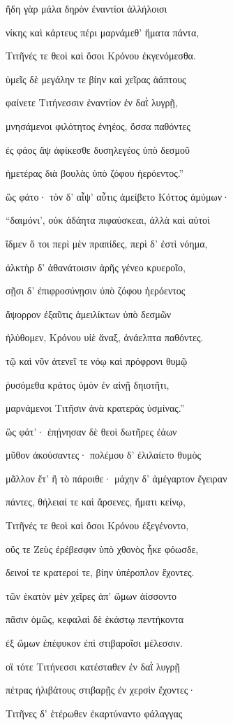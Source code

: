 \begin{pages}
\begin{Leftside}
ἤδη γὰρ μάλα δηρὸν ἐναντίοι ἀλλήλοισι

νίκης καὶ κάρτευς πέρι μαρνάμεθ' ἤματα πάντα, 

Τιτῆνές τε θεοὶ καὶ ὅσοι Κρόνου ἐκγενόμεσθα.

ὑμεῖς δὲ μεγάλην τε βίην καὶ χεῖρας ἀάπτους

φαίνετε Τιτήνεσσιν ἐναντίον ἐν δαῒ λυγρῇ, 

μνησάμενοι φιλότητος ἐνηέος, ὅσσα παθόντες

ἐς φάος ἂψ ἀφίκεσθε δυσηλεγέος ὑπὸ δεσμοῦ

ἡμετέρας διὰ βουλὰς ὑπὸ ζόφου ἠερόεντος.''

ὣς φάτο· τὸν δ' αἶψ' αὖτις ἀμείβετο Κόττος ἀμύμων· 

``δαιμόνι', οὐκ ἀδάητα πιφαύσκεαι, ἀλλὰ καὶ αὐτοὶ  

ἴδμεν ὅ τοι περὶ μὲν πραπίδες, περὶ δ' ἐστὶ νόημα,

ἀλκτὴρ δ' ἀθανάτοισιν ἀρῆς γένεο κρυεροῖο, 

σῇσι δ' ἐπιφροσύνῃσιν ὑπὸ ζόφου ἠερόεντος

ἄψορρον ἐξαῦτις ἀμειλίκτων ὑπὸ δεσμῶν

ἠλύθομεν, Κρόνου υἱὲ ἄναξ, ἀνάελπτα παθόντες. 

τῷ καὶ νῦν ἀτενεῖ τε νόῳ καὶ πρόφρονι θυμῷ

ῥυσόμεθα κράτος ὑμὸν ἐν αἰνῇ δηιοτῆτι, 

μαρνάμενοι Τιτῆσιν ἀνὰ κρατερὰς ὑσμίνας.'' 

ὣς φάτ'· ἐπῄνησαν δὲ θεοὶ δωτῆρες ἐάων 

μῦθον ἀκούσαντες· πολέμου δ' ἐλιλαίετο θυμὸς  

μᾶλλον ἔτ' ἢ τὸ πάροιθε· μάχην δ' ἀμέγαρτον ἔγειραν 

πάντες, θήλειαί τε καὶ ἄρσενες, ἤματι κείνῳ,

Τιτῆνές τε θεοὶ καὶ ὅσοι Κρόνου ἐξεγένοντο,

οὕς τε Ζεὺς ἐρέβεσφιν ὑπὸ χθονὸς ἧκε φόωσδε,

δεινοί τε κρατεροί τε, βίην ὑπέροπλον ἔχοντες. 

τῶν ἑκατὸν μὲν χεῖρες ἀπ' ὤμων ἀίσσοντο

πᾶσιν ὁμῶς, κεφαλαὶ δὲ ἑκάστῳ πεντήκοντα

ἐξ ὤμων ἐπέφυκον ἐπὶ στιβαροῖσι μέλεσσιν.

οἳ τότε Τιτήνεσσι κατέσταθεν ἐν δαῒ λυγρῇ

πέτρας ἠλιβάτους στιβαρῇς ἐν χερσὶν ἔχοντες·  

Τιτῆνες δ' ἑτέρωθεν ἐκαρτύναντο φάλαγγας


\end{Leftside}
\end{pages}
